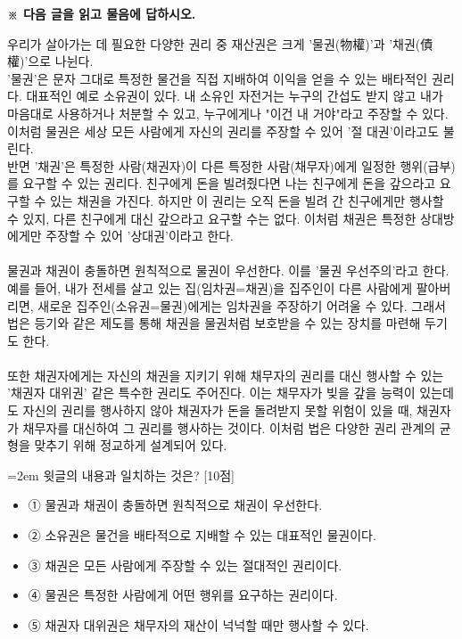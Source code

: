 \documentclass[11pt,a4paper]{article}
\newcommand{\qnum}[1]{%
  \tikz[baseline=(num.base)]{%
    \node[circle, fill=numCircle, text=white, inner sep=0pt,
          minimum size=18pt, font=\small\bfseries] (num) {#1};%
  }%
}
\newcommand{\pts}[1]{%
  \hfill\textcolor{ptsBadge}{[#1점]}%
}
\begin{document}
\vspace{4mm}
{\small\textbf{※ 다음 글을 읽고 물음에 답하시오.}}
\vspace{2mm}
\begin{tcolorbox}[passage]
우리가 살아가는 데 필요한 다양한 권리 중 재산권은 크게 '물권(物權)'과 '채권(債權)'으로 나뉜다. \\{}
'물권'은 문자 그대로 특정한 물건을 직접 지배하여 이익을 얻을 수 있는 배타적인 권리다. 대표적인 예로 소유권이 있다. 내 소유인 자전거는 누구의 간섭도 받지 않고 내가 마음대로 사용하거나 처분할 수 있고, 누구에게나 "이건 내 거야"라고 주장할 수 있다. 이처럼 물권은 세상 모든 사람에게 자신의 권리를 주장할 수 있어 '절 대권'이라고도 불린다. \\{}
반면 '채권'은 특정한 사람(채권자)이 다른 특정한 사람(채무자)에게 일정한 행위(급부)를 요구할 수 있는 권리다. 친구에게 돈을 빌려줬다면 나는 친구에게 돈을 갚으라고 요구할 수 있는 채권을 가진다. 하지만 이 권리는 오직 돈을 빌려 간 친구에게만 행사할 수 있지, 다른 친구에게 대신 갚으라고 요구할 수는 없다. 이처럼 채권은 특정한 상대방에게만 주장할 수 있어 '상대권'이라고 한다. \\{}
\vspace{4pt} \\{}
물권과 채권이 충돌하면 원칙적으로 물권이 우선한다. 이를 '물권 우선주의'라고 한다. 예를 들어, 내가 전세를 살고 있는 집(임차권=채권)을 집주인이 다른 사람에게 팔아버리면, 새로운 집주인(소유권=물권)에게는 임차권을 주장하기 어려울 수 있다. 그래서 법은 등기와 같은 제도를 통해 채권을 물권처럼 보호받을 수 있는 장치를 마련해 두기도 한다. \\{}
\vspace{4pt} \\{}
또한 채권자에게는 자신의 채권을 지키기 위해 채무자의 권리를 대신 행사할 수 있는 '채권자 대위권' 같은 특수한 권리도 주어진다. 이는 채무자가 빚을 갚을 능력이 있는데도 자신의 권리를 행사하지 않아 채권자가 돈을 돌려받지 못할 위험이 있을 때, 채권자가 채무자를 대신하여 그 권리를 행사하는 것이다. 이처럼 법은 다양한 권리 관계의 균형을 맞추기 위해 정교하게 설계되어 있다.
\end{tcolorbox}
\vspace{3mm}
\begin{minipage}{\columnwidth}
{\hangindent=2em
\qnum{25}\enspace 윗글의 내용과 일치하는 것은? \pts{10}
\par}

\vspace{3mm}
\begin{itemize}[leftmargin=2.5em, labelsep=0.3em, label={}, itemsep=4pt, parsep=1pt, topsep=0pt]
  \item ① 물권과 채권이 충돌하면 원칙적으로 채권이 우선한다.
  \item ② 소유권은 물건을 배타적으로 지배할 수 있는 대표적인 물권이다.
  \item ③ 채권은 모든 사람에게 주장할 수 있는 절대적인 권리이다.
  \item ④ 물권은 특정한 사람에게 어떤 행위를 요구하는 권리이다.
  \item ⑤ 채권자 대위권은 채무자의 재산이 넉넉할 때만 행사할 수 있다.
\end{itemize}
\end{minipage}
\vspace{4mm}
\end{document}
